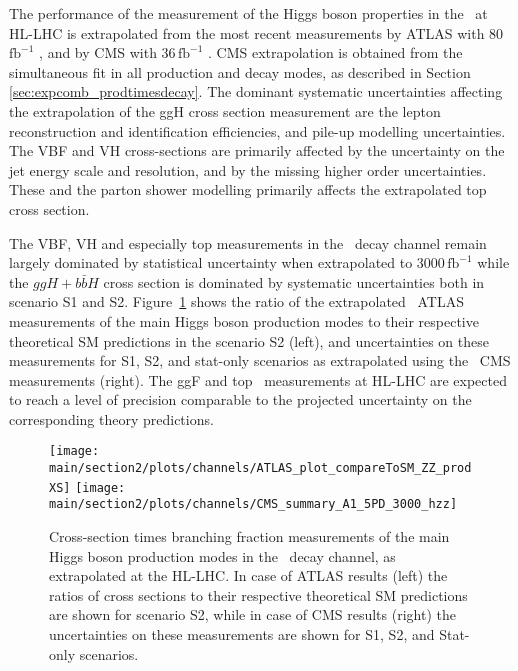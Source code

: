 The performance of the measurement of the Higgs boson properties in the \HZZ\ at HL-LHC is extrapolated from the most recent measurements by ATLAS with 80\,$\mathrm{fb}^{-1}$ \cite{ATLAS:2018bsg}, and by CMS with 36\,$\mathrm{fb}^{-1}$ \cite{Sirunyan:2017exp}.
CMS extrapolation is obtained from the simultaneous fit in all production and decay modes, as described in Section \ref{sec:expcomb_prodtimesdecay}.
The dominant systematic uncertainties affecting the extrapolation of the ggH cross section measurement are the lepton reconstruction and identification efficiencies, and pile-up modelling uncertainties. The VBF and VH cross-sections are primarily affected by the uncertainty on the jet energy scale and resolution, and by the
missing higher order uncertainties.
These and
the parton shower modelling primarily affects the extrapolated top cross section.

The VBF, VH and especially top measurements in the \HZZ\ decay channel remain largely dominated by statistical uncertainty when extrapolated to 3000\,$\mathrm{fb}^{-1}$ while the $ggH+b\bar{b}H$ cross section is dominated by systematic uncertainties both in scenario S1 and S2.
%
Figure~\ref{fig:HZZ_ATLAS_HLLHC_S2} shows the ratio of the extrapolated \HZZ\ ATLAS measurements of the main Higgs boson production modes to their respective theoretical SM predictions in the scenario S2 (left), and uncertainties on these measurements for S1, S2, and stat-only scenarios as extrapolated using the \HZZ\ CMS measurements (right). The ggF and top \HZZ\ measurements at HL-LHC are expected to reach a level of precision comparable to the projected uncertainty on the corresponding theory predictions.

\begin{figure}
  \centering
  \texttt{[image: \\main/section2/plots/channels/ATLAS\_plot\_compareToSM\_ZZ\_prodXS]}
  \texttt{[image: \\main/section2/plots/channels/CMS\_summary\_A1\_5PD\_3000\_hzz]}
  \caption{Cross-section times branching fraction measurements of the main Higgs boson production modes in the \HZZ\ decay channel, as extrapolated at the HL-LHC. In case of ATLAS results (left) the ratios of cross sections to their respective theoretical SM predictions are shown for scenario S2, while in case of CMS results (right) the uncertainties on these measurements are shown for S1, S2, and Stat-only scenarios.}
  \label{fig:HZZ_ATLAS_HLLHC_S2}
\end{figure}


